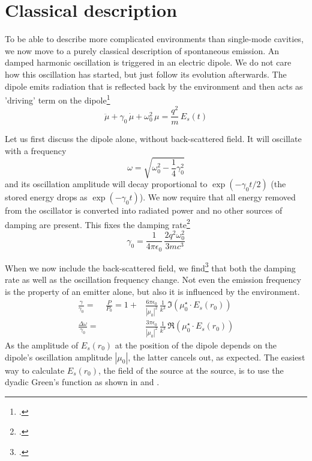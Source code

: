 \section{Classical description}

To be able to describe more complicated environments than single-mode cavities, we now move to a purely classical description of spontaneous emission. An damped harmonic oscillation is triggered in an electric dipole. We do not care how this oscillation has started, but just follow its evolution afterwards. The dipole emits radiation that is reflected back by the environment and then acts as 'driving' term on the dipole\footcite[chapter 8.5.2]{Novotny-Hecht2012}
\begin{equation}
 \ddot{\mu} + \gamma_0 \, \dot{\mu} + \omega_0^2 \, \mu = \frac{q^2}{m} \, E_s(t)
\end{equation}

Let us first discuss the dipole alone, without back-scattered field. It will oscillate with a frequency
\begin{equation}
 \omega = \sqrt{\omega_0 ^2 - \frac{1}{4} \gamma_0^2}
\end{equation}
and its oscillation amplitude will decay proportional to $\exp(- \gamma_0 t /2)$ (the stored energy drops as $\exp( - \gamma_0 t)$). We now require that all energy removed from the oscillator is converted into radiated power and no other sources of damping are present. This fixes the damping rate\footcite{Novotny-Hecht2012}
\begin{equation}
\gamma_0 = \frac{1}{4  \pi  \epsilon_0} \, \frac{2 q^2 \omega_0^2}{3 m c^3}
\end{equation}

When we now include the back-scattered field, we find\footcite[chapter 8.5.2]{Novotny-Hecht2012} that both the damping rate as well as the oscillation frequency change. Not even the emission frequency is the property of an emitter alone, but also it is influenced by the environment.
\begin{eqnarray}
 \frac{\gamma}{\gamma_0}  = &
 \frac{P}{P_0} = 
  1 + & \frac{6 \pi \epsilon_0}{|\mu_0|^2} \, \frac{1}{k^3} 
  \, \Im \left( \mu_0^\star \cdot E_s(r_0) \right) \\
 \frac{\Delta \omega}{\gamma_0} =& &
  \frac{3 \pi \epsilon_0}{|\mu_0|^2} \, \frac{1}{k^3} 
  \, \Re \left( \mu_0^\star \cdot E_s(r_0) \right)
\end{eqnarray}
As the amplitude of $ E_s(r_0)$ at the position of the dipole depends on the dipole's oscillation amplitude $|\mu_0|$, the latter cancels out, as expected. The easiest way to calculate $ E_s(r_0)$, the field of the source at the source, is to use the dyadic Green's function as shown in \cite{Novotny-Hecht2012} and \cite{Hohenester2020}.

